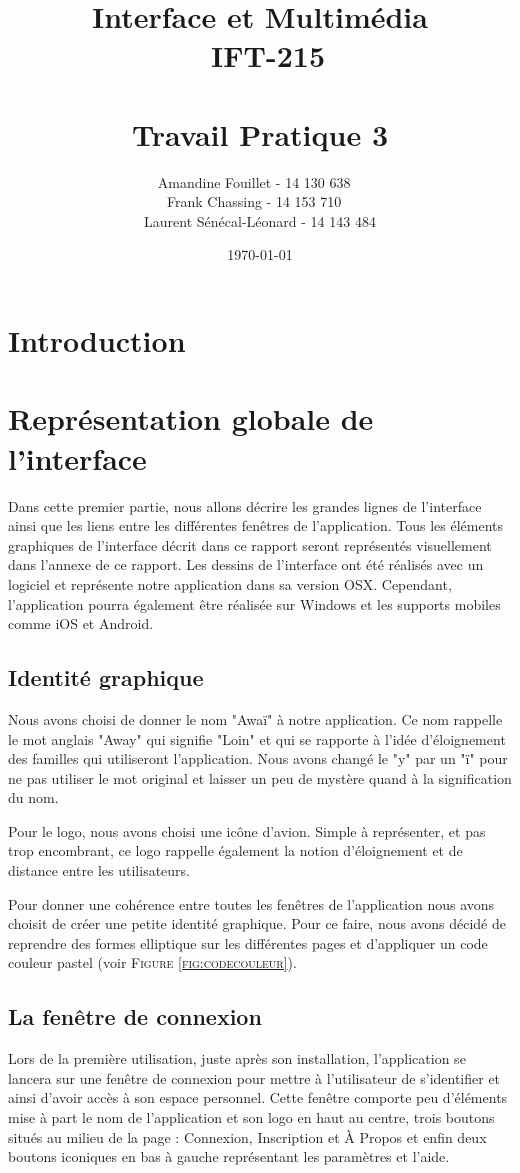 \documentclass[11pt]{article}
\title{\vspace{\fill} Interface et Multimédia \\ ~\textbf{IFT-215} \\~\\ Travail Pratique 3}
\author{Amandine Fouillet - 14 130 638 ~\\ Frank Chassing - 14 153 710 ~\\ Laurent Sénécal-Léonard - 14 143 484}
\date{\today \vspace{\fill}}
\begin{document}
\maketitle
\newpage

\tableofcontents
\listoffigures
\newpage
\section*{Introduction}


\section{Représentation globale de l'interface}
Dans cette premier partie, nous allons décrire les grandes lignes de l'interface ainsi que les liens entre les différentes fenêtres de l'application. Tous les éléments graphiques de l'interface décrit dans ce rapport seront représentés visuellement dans l'annexe de ce rapport. Les dessins de l'interface ont été réalisés avec un logiciel et représente notre application dans sa version OSX. Cependant, l'application pourra également être réalisée sur Windows et les supports mobiles comme iOS et Android. 
\subsection{Identité graphique}
Nous avons choisi de donner le nom "Awaï" à notre application. Ce nom rappelle le mot anglais "Away" qui signifie "Loin" et qui se rapporte à l'idée d'éloignement des familles qui utiliseront l'application. Nous avons changé le "y" par un "ï" pour ne pas utiliser le mot original et laisser un peu de mystère quand à la signification du nom. 

Pour le logo, nous avons choisi une icône d'avion. Simple à représenter, et pas trop encombrant, ce logo rappelle également la notion d'éloignement et de distance entre les utilisateurs.

Pour donner une cohérence entre toutes les fenêtres de l'application nous avons choisit de créer une petite identité graphique. Pour ce faire, nous avons décidé de reprendre des formes elliptique sur les différentes pages et d'appliquer un code couleur pastel (voir \textsc{Figure \ref{fig:codecouleur}}).
\subsection{La fenêtre de connexion}
Lors de la première utilisation, juste après son installation, l'application se lancera sur une fenêtre de connexion pour mettre à l'utilisateur de s'identifier et ainsi d'avoir accès à son espace personnel. Cette fenêtre comporte peu d'éléments mise à part le nom de l'application et son logo en haut au centre, trois boutons situés au milieu de la page : Connexion, Inscription et À Propos et enfin deux boutons iconiques en bas à gauche représentant les paramètres et l'aide. 
\end{document}
